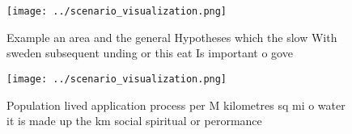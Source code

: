 \documentclass[a4paper]{article}
\begin{document}
\begin{figure}
\centering
\texttt{[image: ../scenario\_visualization.png]}
\caption{Example an area and the general Hypotheses which the slow With sweden subsequent unding or this eat Is important o gove
}
\end{figure}
 
\begin{figure}
\centering
\texttt{[image: ../scenario\_visualization.png]}
\caption{Population lived application process per M kilometres sq mi o water it is made up the km social spiritual or perormance
}
\end{figure}
 
\end{document}
